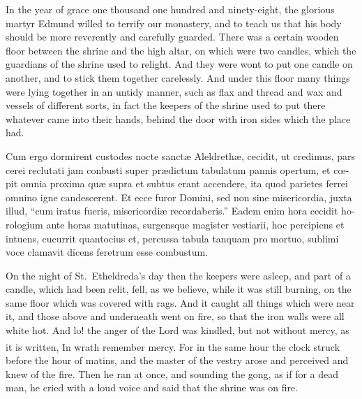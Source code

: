 \documentclass{book}
\newcounter{engnote}
\newcommand{\engnotenum}{\textsuperscript{\arabic{engnote}\stepcounter{engnote}}}
\newcommand{\engnotetext}[1]{\vphantom{\footnotemark{}}\footnotetext{#1}}
\begin{document}
\begin{paracol}{2}
\begin{otherlanguage}{latin}
\end{otherlanguage}

\switchcolumn

In the year of grace one thousand one hundred and ninety-eight, the glorious martyr Edmund willed to terrify our monastery, and to teach us that his body should be more reverently and carefully guarded. There was a certain wooden floor between the shrine and the high altar, on which were two candles, which the guardians of the shrine used to relight. And they were wont to put one candle on another, and to stick them together carelessly. And under this floor many things were lying together in an untidy manner, such as flax and thread and wax and vessels of different sorts, in fact the keepers of the shrine used to put there whatever came into their hands, behind the door with iron sides which the place had.

\switchcolumn*

\begin{otherlanguage}{latin}
Cum ergo dormirent custodes nocte sanct\ae{} Aleldreth\ae{}, cecidit, ut credimus, pars cerei reclutati jam conbusti super pr\ae{}dictum tabulatum pannis opertum, et c\oe{}pit omnia proxima qu\ae{} supra et subtus erant accendere, ita quod parietes ferrei omnino igne candescerent. Et ecce furor Domini, sed non sine misericordia, juxta illud, ``cum iratus fueris, misericordi\ae{} recordaberis.''\engnotetext{Hab.\ iii., \oldstylenums{2}.} Eadem enim hora cecidit horologium ante horas matutinas, surgensque magister vestiarii, hoc percipiens et intuens, cucurrit quantocius et, percussa tabula tanquam pro mortuo, sublimi voce clamavit dicens feretrum esse combustum.
\end{otherlanguage}

\switchcolumn

On the night of St.\ Etheldreda's day then the keepers were asleep, and part of a candle, which had been relit, fell, as we believe, while it was still burning, on the same floor which was covered with rags. And it caught all things which were near it, and those above and underneath went on fire, so that the iron walls were all white hot. And lo! the anger of the Lord was kindled, but not without mercy, as it is written, In wrath remember mercy.\engnotenum{} For in the same hour the clock struck before the hour of matins, and the master of the vestry arose and perceived and knew of the fire. Then he ran at once, and sounding the gong, as if for a dead man, he cried with a loud voice and said that the shrine was on fire.


\end{paracol}
\end{document}
